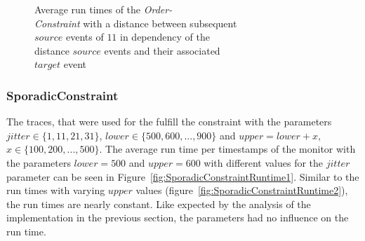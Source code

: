 \begin{figure}
\begin{minipage}{0.45\textwidth}
		\centering
		\caption{Average run times of the \textit{Order-\\Constraint} with a distance between subsequent\\ $source$ events of $11$ in dependency of the\\ distance $source$ events and their associated\\ $target$ event}
		\label{fig:OrderConstraintRunTime2}
	\end{minipage}
\end{figure}

\subsubsection{SporadicConstraint}
The traces, that were used for the fulfill the constraint with the parameters $jitter\in\{1,11,21,31\}$, $lower\in\{500,600,...,900\}$ and $upper=lower+x$, $x\in\{100, 200, ..., 500\}$. The average run time per timestamps of the monitor with the parameters $lower=500$ and $upper=600$ with different values for the $jitter$ parameter can be seen in Figure~\ref{fig:SporadicConstraintRuntime1}. Similar to the run times with varying $upper$ values (figure~\ref{fig:SporadicConstraintRuntime2}), the run times are nearly constant. Like expected by the analysis of the implementation in the previous section, the parameters had no influence on the run time.

